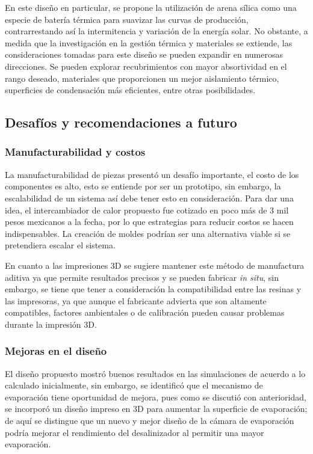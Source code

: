 		En este diseño en particular, se propone la utilización de arena sílica como una especie de batería térmica para suavizar las curvas de producción, contrarrestando así la intermitencia y variación de la energía solar. No obstante, a medida que la investigación en la gestión térmica y materiales se extiende, las consideraciones tomadas para este diseño se pueden expandir en numerosas direcciones. Se pueden explorar recubrimientos con mayor absortividad en el rango deseado, materiales que proporcionen un mejor aislamiento térmico, superficies de condensación más eficientes, entre otras posibilidades.
	
	\subsection{Desafíos y recomendaciones a futuro}
		
		\subsubsection{Manufacturabilidad y costos}
			
			La manufacturabilidad de piezas presentó un desafío importante, el costo de los componentes es alto, esto se entiende por ser un prototipo, sin embargo, la escalabilidad de un sistema así debe tener esto en consideración. Para dar una idea, el intercambiador de calor propuesto fue cotizado en poco más de 3 mil pesos mexicanos a la fecha, por lo que estrategias para reducir costos se hacen indispensables. La creación de moldes podrían ser una alternativa viable si se pretendiera escalar el sistema.
		
			En cuanto a las impresiones 3D se sugiere mantener este método de manufactura aditiva ya que permite resultados precisos y se pueden fabricar \textit{in situ}, sin embargo, se tiene que tener a consideración la compatibilidad entre las resinas y las impresoras, ya que aunque el fabricante advierta que son altamente compatibles, factores ambientales o de calibración pueden causar problemas durante la impresión 3D.
			
		
		\subsubsection{Mejoras en el diseño}
		
			El diseño propuesto mostró buenos resultados en las simulaciones de acuerdo a lo calculado inicialmente, sin embargo, se identificó que el mecanismo de evaporación tiene oportunidad de mejora, pues como se discutió con anterioridad, se incorporó un diseño impreso en 3D para aumentar la superficie de evaporación; de aquí se distingue que un nuevo y mejor diseño de la cámara de evaporación podría mejorar el rendimiento del desalinizador al permitir una mayor evaporación.
		

